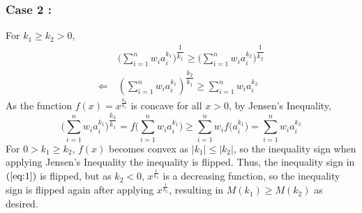 \documentclass[12pt]{article}
\begin{document}
	\pagebreak 


\subsubsection{Case 2 :}
\Large{For $k_1\ge k_2>0$,
\begin{align}
& \ \Bigg(\sum_{i=1}^n w_ia_i^{k_1} \Bigg)^{\dfrac{1}{k_1}} \ge \Bigg(\sum_{i=1}^n w_ia_i^{k_2} \Bigg)^{\dfrac{1}{k_2}}\nonumber\\
\label{eq:1}\Longleftarrow & \ \left(\sum_{i=1}^n w_ia_i^{k_1} \right)^{\dfrac{k_2}{k_1}} \ge \sum_{i=1}^n w_ia_i^{k_2} 
\end{align}As the function $f(x)=x^{\frac{k_2}{k_1}}$ is concave for all $x > 0$, by Jensen's Inequality,\[\Bigg(\sum_{i=1}^n w_i a_i^{k_1} \Bigg)^{\dfrac{k_2}{k_1}} = f\Bigg(\sum_{i=1}^n w_i a_i^{k_1} \Bigg) \geq \sum_{i=1}^n w_i f\Big(a_i^{k_1}\Big) =\sum_{i=1}^n w_i a_{i}^{k_2}\]For $0>k_1\ge k_2$, $f(x)$ becomes convex as $|k_1|\le |k_2|$, so the inequality sign when applying Jensen's Inequality the inequality is flipped. Thus, the inequality sign in $(\ref{eq:1})$ is flipped, but as $k_2<0$, $x^{\frac{1}{k_2}}$ is a decreasing function, so the inequality sign is flipped again after applying $x^{\frac{1}{k_2}}$, resulting in $M(k_1)\ge M(k_2)$ as desired.}
\end{document}
